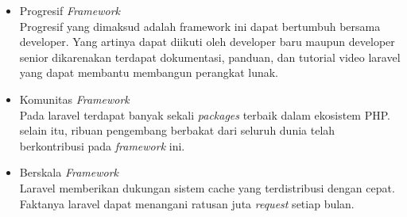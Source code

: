 \begin{itemize}
	\item Progresif \textit{Framework} \\
	Progresif yang dimaksud adalah framework ini dapat bertumbuh bersama developer. Yang artinya dapat diikuti oleh developer baru maupun developer senior dikarenakan terdapat dokumentasi, panduan, dan tutorial video laravel yang dapat membantu membangun perangkat lunak.
	\item Komunitas \textit{Framework} \\
	Pada laravel terdapat banyak sekali \textit{packages} terbaik dalam ekosistem PHP. selain itu, ribuan pengembang berbakat dari seluruh dunia telah berkontribusi pada \textit{framework} ini.
	\item Berskala \textit{Framework} \\
	Laravel memberikan dukungan sistem cache yang terdistribusi dengan cepat. Faktanya laravel dapat menangani ratusan juta \textit{request} setiap bulan.
\end{itemize}

